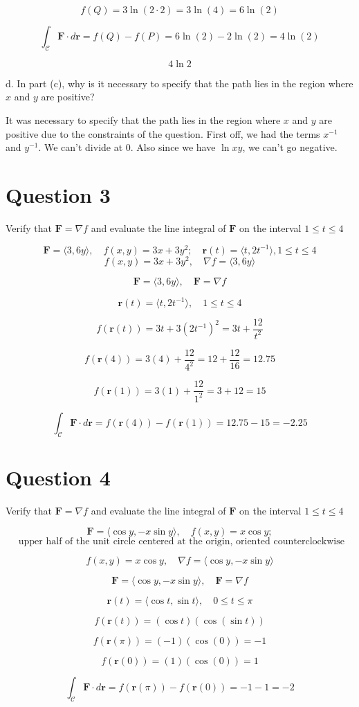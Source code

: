 \documentclass[hidelinks]{article}
\begin{document}
\[
f(Q) = 3 \ln(2 \cdot 2) = 3 \ln(4) = 6 \ln(2)
\]

\[
\int_\mathcal{C} \mathbf{F} \cdot d\mathbf{r} = f(Q) - f(P) = 6 \ln(2) - 2 \ln(2) = 4 \ln(2)
\]

\[
4 \ln2
\]

d. In part (c), why is it necessary to specify that the path lies in the region where $x$ and $y$ are positive?

It was necessary to specify that the path lies in the region where $x$ and $y$ are positive due to the constraints of the question. First off, we had the terms $x^{-1}$ and $y^{-1}$. We can't divide at 0. Also since we have $\ln xy$, we can't go negative.

\newpage
\section*{Question 3}
Verify that $\mathbf{F} = \nabla f $ and evaluate the line integral of $\mathbf{F}$ on the interval $1 \leq t \leq 4$

\[
    \mathbf{F} = \langle 3, 6y \rangle , \quad f(x,y) = 3x+3y^2; \quad \mathbf{r}(t) = \langle t, 2t^{-1} \rangle, 1 \leq t \leq 4
\]
\[
f(x, y) = 3x + 3y^2, \quad \nabla f = \langle 3, 6y \rangle
\]

\[
\mathbf{F} = \langle 3, 6y \rangle, \quad \mathbf{F} = \nabla f
\]

\[
\mathbf{r}(t) = \langle t, 2t^{-1} \rangle, \quad 1 \leq t \leq 4
\]

\[
f(\mathbf{r}(t)) = 3t + 3(2t^{-1})^2 = 3t + \frac{12}{t^2}
\]

\[
f(\mathbf{r}(4)) = 3(4) + \frac{12}{4^2} = 12 + \frac{12}{16} = 12.75
\]

\[
f(\mathbf{r}(1)) = 3(1) + \frac{12}{1^2} = 3 + 12 = 15
\]

\[
\int_\mathcal{C} \mathbf{F} \cdot d\mathbf{r} = f(\mathbf{r}(4)) - f(\mathbf{r}(1)) = 12.75 - 15 = -2.25
\]


\newpage
\section*{Question 4}
Verify that $\mathbf{F} = \nabla f $ and evaluate the line integral of $\mathbf{F}$ on the interval $1 \leq t \leq 4$

\[
    \mathbf{F} = \langle \cos y, - x \sin y \rangle , \quad f(x,y) = x \cos y; 
\]
\[
\text{ upper half of the unit circle centered at the origin, oriented counterclockwise}
\]

\[
f(x, y) = x \cos y, \quad \nabla f = \langle \cos y, -x \sin y \rangle
\]

\[
\mathbf{F} = \langle \cos y, -x \sin y \rangle, \quad \mathbf{F} = \nabla f
\]

\[
\mathbf{r}(t) = \langle \cos t, \sin t \rangle, \quad 0 \leq t \leq \pi
\]

\[
f(\mathbf{r}(t)) = (\cos t)(\cos(\sin t))
\]

\[
f(\mathbf{r}(\pi)) = (-1)(\cos(0)) = -1
\]

\[
f(\mathbf{r}(0)) = (1)(\cos(0)) = 1
\]

\[
\int_\mathcal{C} \mathbf{F} \cdot d\mathbf{r} = f(\mathbf{r}(\pi)) - f(\mathbf{r}(0)) = -1 - 1 = -2
\]
\end{document}
